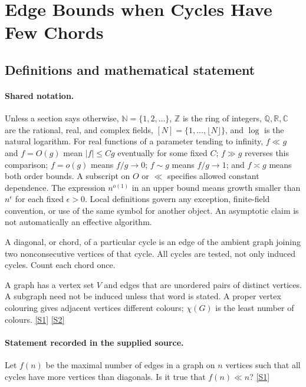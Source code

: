 \documentclass[11pt,a4paper]{article}
\newcommand{\N}{\mathbb{N}}
\newcommand{\Z}{\mathbb{Z}}
\newcommand{\Q}{\mathbb{Q}}
\newcommand{\R}{\mathbb{R}}
\newcommand{\C}{\mathbb{C}}
\newcommand{\sref}[2]{\hyperlink{source:#1:#2}{[S#2]}}
\begin{document}
\section{Edge Bounds when Cycles Have Few Chords}\label{statement}


\subsection{Definitions and mathematical statement}

\paragraph{Shared notation.}Unless a section says otherwise, $\N=\{1,2,\ldots\}$,
$\Z$ is the ring of integers, $\Q,\R,\C$ are the rational, real, and complex
fields, $[N]=\{1,\ldots,\lfloor N\rfloor\}$, and $\log$ is the natural
logarithm. For real functions of a parameter tending to infinity,
$f\ll g$ and $f=O(g)$ mean $|f|\leq Cg$ eventually for some fixed $C$;
$f\gg g$ reverses this comparison; $f=o(g)$ means $f/g\to0$;
$f\sim g$ means $f/g\to1$; and $f\asymp g$ means both order bounds.
A subscript on $O$ or $\ll$ specifies allowed constant dependence.
The expression $n^{o(1)}$ in an upper bound means growth smaller than
$n^\epsilon$ for each fixed $\epsilon>0$. Local definitions govern any
exception, finite-field convention, or use of the same symbol for another
object. An asymptotic claim is not automatically an effective algorithm.



A diagonal, or chord, of a particular cycle is an edge of the ambient graph joining two nonconsecutive vertices of that cycle. All cycles are tested, not only induced cycles. Count each chord once.

A graph has a vertex set $V$ and edges that are unordered pairs of distinct vertices. A subgraph need not be induced unless that word is stated. A proper vertex colouring gives adjacent vertices different colours; $\chi(G)$ is the least number of colours. \sref{statement}{1} \sref{statement}{2}

\paragraph{Statement recorded in the supplied source.}
Let $f(n)$ be the maximal number of edges in a graph on $n$ vertices such that all cycles have more vertices than diagonals. Is it true that $f(n)\ll n$? \sref{statement}{1}
\end{document}
